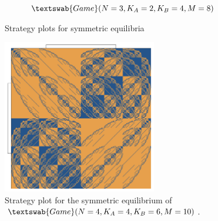 \documentclass{beamer}
\theoremstyle{definition}
\newcommand{\G}[1]{$\textswab{Game}(#1)$}
\begin{document}
\begin{frame}{}
\begin{figure}[H]
\begin{subfigure}[b]{0.45\textwidth}
        \caption{\small \centering \G{N=3,K_A=2,K_B=4,M=8}}
        \label{fig:StrategyPlot_G_3_2_4_8}
    \end{subfigure}
    \caption{\small \centering Strategy plots for symmetric equilibria}
    \label{fig:StrategyPlots}
\end{figure}


\end{frame}

\begin{frame}{}

\begin{figure}[H]
    \centering
    \includegraphics[width=0.6\textwidth]{img/StrategyPlot_4_4_6_10.pdf}
    \caption{\small \centering Strategy plot for the symmetric equilibrium of \G{N=4,K_A=4,K_B=6,M=10}.}
    \label{fig:StrategyPlot_G_4_4_6_10}
\end{figure}

\end{frame}
\end{document}
